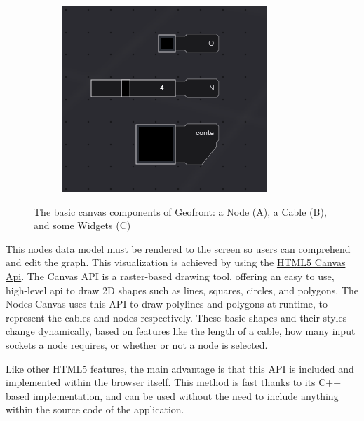 \begin{figure}
\begin{subfigure}[b]{0.30\linewidth}
    \graphicspath{ {../../assets/images/implementation/} }
    \centering
    \includegraphics[width=\linewidth]{widgets.png}
    \caption{}\label{fig:node-cable:3}
  \end{subfigure}%
  \caption[Nodes, Widgets and Cables]{The basic canvas components of Geofront: a Node (A), a Cable (B), and some Widgets (C) }
  \label{fig:node-cable}
\end{figure}

This nodes data model must be rendered to the screen so users can comprehend and edit the graph. 
This visualization is achieved by using the \href{https://developer.mozilla.org/en-US/docs/Web/API/Canvas_API}{HTML5 Canvas Api}. 
The Canvas API is a raster-based drawing tool, offering an easy to use, high-level api to draw 2D shapes such as lines, squares, circles, and polygons. 
The Nodes Canvas uses this API to draw polylines and polygons at runtime, to represent the cables and nodes respectively. 
These basic shapes and their styles change dynamically, based on features like the length of a cable, how many input sockets a node requires, or whether or not a node is selected. 

Like other HTML5 features, the main advantage is that this API is included and implemented within the browser itself. This method is fast thanks to its C++ based implementation, and can be used without the need to include anything within the source code of the application.

